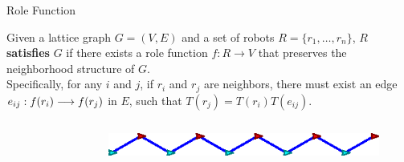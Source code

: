 \begin{frame}{Role Function}
  \begin{definition}
    \small{Given a lattice graph $G=(V, E)$ and a set of robots $R = \{
    r_1, \ldots, r_n \}$, $R$ \textbf{satisfies} $G$ if
    there exists a role function $f: R \rightarrow V$ that preserves
    the neighborhood structure of $G$.
    \\
    Specifically, for any $i$ and $j$, if $r_i$ and $r_j$ are neighbors, 
    there must exist an edge
    $e_{ij}: {f(r_i)}\overset{}{\longrightarrow}{f(r_j)}$ in $E$, such that
    $ T(r_j) = T(r_i) T(e_{ij})$.}
  \end{definition}
  \begin{columns}[T] 
    \begin{column}{.4\textwidth}
      \begin{figure}
        \centering
      \end{figure}
    \end{column}%
    \begin{column}{.5\textwidth}
      \begin{figure}
        \centering
        \includegraphics[width=0.75\linewidth]{figs/bad-hexagon}
      \end{figure}

\end{column}
\end{columns}
\end{frame}
